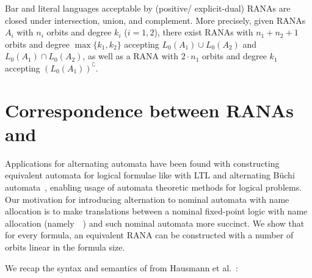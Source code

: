 \documentclass[10pt, final, conference, a4paper, twocolumn]{IEEEtran}
\begin{document}
\begin{theo} \label{thm:closure} Bar and literal
  languages acceptable by (positive/ explicit-dual) RANAs are closed
  under intersection, union, and complement. More precisely, given RANAs $A_i$ with $n_i$ orbits and degree $k_i$ ($i=1,2$), there exist RANAs with $n_1+n_2+1$ orbits and degree $\max\{k_1,k_2\}$ accepting $L_0(A_1)\cup L_0(A_2)$ and $L_0(A_1)\cap L_0(A_2)$, as well as a RANA with $2\cdot n_1$ orbits and degree $k_1$ accepting $(L_0(A_1))^\complement$.
\end{theo}

\section{Correspondence between RANAs and \muBar}\label{sec:logic}

Applications for alternating automata have been found with constructing equivalent
automata for logical formulae like with LTL and alternating Büchi automata~\cite{mss88,var94}, enabling usage of automata theoretic methods
for logical problems.
Our motivation for introducing alternation to nominal automata with name allocation is to
make translations between a nominal fixed-point logic with name allocation (namely~\muBar~\cite{hms21})
and such nominal automata more succinct. We show that for every \muBar formula, an equivalent
RANA can be constructed with a number of orbits linear in the formula size.

We recap the syntax and semantics of \muBar from Hausmann et al.~\cite{hms21}:
\end{document}
